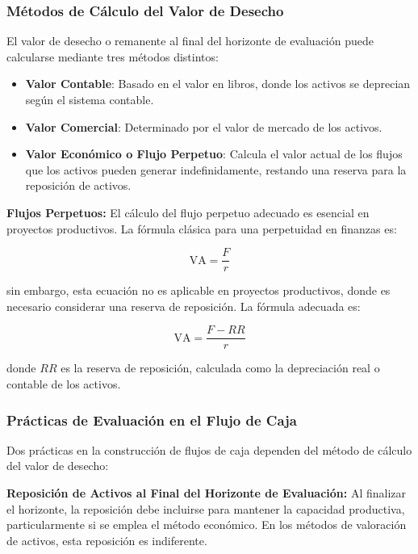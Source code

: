 \documentclass{templateNote}
\begin{document}
\subsubsection*{Métodos de Cálculo del Valor de Desecho}
El valor de desecho o remanente al final del horizonte de evaluación puede calcularse mediante tres métodos distintos:

\begin{itemize}
    \item \textbf{Valor Contable}: Basado en el valor en libros, donde los activos se deprecian según el sistema contable.
    \item \textbf{Valor Comercial}: Determinado por el valor de mercado de los activos.
    \item \textbf{Valor Económico o Flujo Perpetuo}: Calcula el valor actual de los flujos que los activos pueden generar indefinidamente, restando una reserva para la reposición de activos.
\end{itemize}

\textbf{Flujos Perpetuos:}
El cálculo del flujo perpetuo adecuado es esencial en proyectos productivos. La fórmula clásica para una perpetuidad en finanzas es:

\begin{equation*}
    \text{VA} = \frac{F}{r}
\end{equation*}

sin embargo, esta ecuación no es aplicable en proyectos productivos, donde es necesario considerar una reserva de reposición. La fórmula adecuada es:

\begin{equation*}
    \text{VA} = \frac{F - RR}{r}
\end{equation*}

donde $RR$ es la reserva de reposición, calculada como la depreciación real o contable de los activos.

\subsubsection*{Prácticas de Evaluación en el Flujo de Caja}
Dos prácticas en la construcción de flujos de caja dependen del método de cálculo del valor de desecho:

\textbf{Reposición de Activos al Final del Horizonte de Evaluación:}
Al finalizar el horizonte, la reposición debe incluirse para mantener la capacidad productiva, particularmente si se emplea el método económico. En los métodos de valoración de activos, esta reposición es indiferente.
\end{document}
